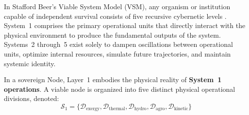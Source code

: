 In Stafford Beer's Viable System Model (VSM), any organism or institution capable of independent survival consists of five recursive cybernetic levels \cite{beer1972brain}. System~1 comprises the primary operational units that directly interact with the physical environment to produce the fundamental outputs of the system. Systems~2 through~5 exist solely to dampen oscillations between operational units, optimize internal resources, simulate future trajectories, and maintain systemic identity.

In a sovereign Node, Layer~1 embodies the physical reality of \textbf{System~1 operations}. A viable node is organized into five distinct physical operational divisions, denoted:
\begin{equation}
\mathcal{S}_1 = \{\mathcal{D}_{\mathrm{exergy}}, \mathcal{D}_{\mathrm{thermal}}, \mathcal{D}_{\mathrm{hydro}}, \mathcal{D}_{\mathrm{agro}}, \mathcal{D}_{\mathrm{kinetic}}\}
\label{eq:vsm_system1_set}
\end{equation}


